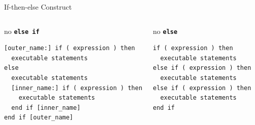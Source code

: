\documentclass[c,mathserif,compress,xcolor=svgnames]{beamer}
\newcommand{\bftt}[1]{\textbf{\texttt{#1}}}
\begin{document}
\begin{frame}{If-then-else Construct}
\begin{columns}
\begin{block}{\scriptsize no \bftt{else if}}
\begin{lstlisting}[language={[90]Fortran},basicstyle=\fontsize{6}{5}\selectfont\ttfamily]
[outer_name:] if ( expression ) then
  executable statements
else
  executable statements
  [inner_name:] if ( expression ) then
    executable statements
  end if [inner_name]
end if [outer_name]
      \end{lstlisting}
    \end{block}
    \column{5cm}
    \begin{block}{\scriptsize no \bftt{else}}
      \begin{lstlisting}[language={[90]Fortran},basicstyle=\fontsize{6}{5}\selectfont\ttfamily]
if ( expression ) then
  executable statements
else if ( expression ) then
  executable statements
else if ( expression ) then
  executable statements
end if
      \end{lstlisting}
    \end{block}
  \end{columns}
\end{frame}
\end{document}
